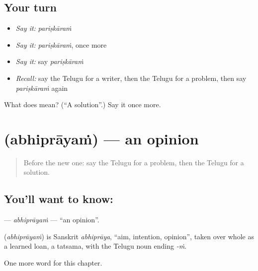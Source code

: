 \subsection*{Your turn}
\begin{itemize}
\raggedright
  \item \emph{Say it:} \emph{pariṣkāraṁ}
  \item \emph{Say it:} \emph{pariṣkāraṁ}, once more
  \item \emph{Say it:} say \emph{pariṣkāraṁ}
  \item \emph{Recall:} say the Telugu for a writer, then the Telugu for a problem, then say \emph{pariṣkāraṁ} again
\end{itemize}

\begin{tcolorbox}[breakable,colback=teal!4,colframe=teal!35!black,title={Before you move on}]
What does  mean? (\textquotedblleft{}A solution\textquotedblright{}.) Say it once more.
\end{tcolorbox}
\section[\texorpdfstring{\te{అభిప్రాయం} (abhiprāyaṁ)}{అభిప్రాయం (abhiprāyaṁ)}]{ (abhiprāyaṁ) — an opinion}

\label{lesson:TE-C197-abhiprayam}



\begin{quote}
Before the new one: say the Telugu for a problem, then the Telugu for a solution.
\end{quote}

\subsection*{You'll want to know: }
\textbf{} — \emph{abhiprāyaṁ} — \textquotedblleft{}an opinion\textquotedblright{}.

\begin{cousinweb}
\textbf{} (\emph{abhiprāyaṁ}) is Sanskrit \emph{abhiprāya}, \textquotedblleft{}aim, intention, opinion\textquotedblright{}, taken over whole as a learned loan, a tatsama, with the Telugu noun ending \emph{-ṁ}.
\end{cousinweb}

\begin{grammarlens}[title={What you've built}]
One more word for this chapter.
\end{grammarlens}

